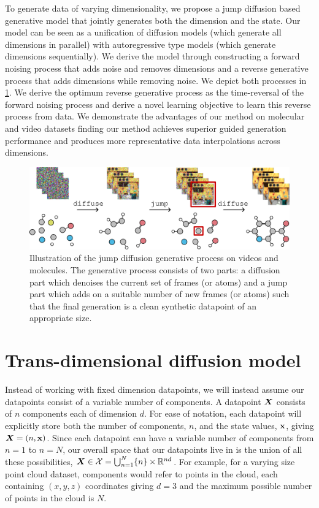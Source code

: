 To generate data of varying dimensionality, we propose a jump diffusion based generative model that jointly generates both the dimension and the state. Our model can be seen as a unification of diffusion models (which generate all dimensions in parallel) with autoregressive type models (which generate dimensions sequentially). We derive the model through constructing a forward noising process that adds noise and removes dimensions and a reverse generative process that adds dimensions while removing noise. We depict both processes in \cref{fig:tddm-fig1}. We derive the optimum reverse generative process as the time-reversal of the forward noising process and derive a novel learning objective to learn this reverse process from data. We demonstrate the advantages of our method on molecular and video datasets finding our method achieves superior guided generation performance and produces more representative data interpolations across dimensions.

\begin{figure}
    \centering
    \includegraphics[width=\textwidth]{figs/tddm/fig1.pdf}
    \caption{Illustration of the jump diffusion generative process on videos and molecules. The generative process consists of two parts: a diffusion part which denoises the current set of frames (or atoms) and a jump part which adds on a suitable number of new frames (or atoms) such that the final generation is a clean synthetic datapoint of an appropriate size.
    }
    \label{fig:tddm-fig1}
\end{figure}


\section{Trans-dimensional diffusion model}
Instead of working with fixed dimension datapoints, we will instead assume our datapoints consist of a variable number of components. A datapoint ${\bm{X}}$ consists of $n$ components each of dimension $d$. For ease of notation, each datapoint will explicitly store both the number of components, $n$, and the state values, ${\mathbf{x}}$, giving ${\bm{X}} = (n, {\mathbf{x}})$. Since each datapoint can have a variable number of components from $n=1$ to $n=N$, our overall space that our datapoints live in is the union of all these possibilities, ${\bm{X}} \in {\mathcal{X}} = \bigcup_{n=1}^N \{n \} \times \mathbb{R}^{nd}$. For example, for a varying size point cloud dataset, components would refer to points in the cloud, each containing $(x,y,z)$ coordinates giving $d=3$ and the maximum possible number of points in the cloud is $N$.

